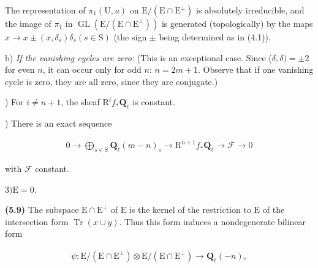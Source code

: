 \documentclass[10pt,leqno]{article}
\begin{document}
\noindent The representation of \(\pi _{1}(\mathrm{U},u)\) on \(\mathrm{E}/(\mathrm{E}\cap \mathrm{E}^{\perp })\) is absolutely irreducible, and the image of \(\pi _{1}\) in \(\operatorname{GL}(\mathrm{E}/(\mathrm{E}\cap \mathrm{E}^{\perp }))\) is generated (topologically) by the maps \(x\longrightarrow x\pm (x,\delta _{s})\delta _{s} (s\in \mathrm{S})\) (the sign \(\pm \) being determined as in (4.1)).\par

\clearpage

\label{physical-22}

\noindent b) \emph{If the vanishing cycles are zero:} (This is an exceptional case. Since (\(\delta ,\delta )=\pm 2\) for even \(n\), it can occur only for odd \(n\): \(n=2m+1\). Observe that if one vanishing cycle is zero, they are all zero, since they are conjugate.)\par

) For \(i\ne n+1\), the sheaf \(\mathrm{R}^{i} f_{*}\mathbf{Q}_{\ell }\) is constant.\par

) There is an exact sequence\par

\begin{equation*}\begin{gathered}0 \longrightarrow  \bigoplus\limits_{s\in \mathrm{S}} \mathbf{Q}_{\ell }(m- n)_{s} \longrightarrow  \mathrm{R}^{n+1}f_{*}\mathbf{Q}_{\ell } \longrightarrow  \mathcal{F}  \longrightarrow  0\end{gathered}\end{equation*}

\noindent with \(\mathcal{F} \) constant.\par

\noindent \(3) \mathrm{E}=0\).\par

\noindent \textbf{(5.9)} The subspace \(\mathrm{E}\cap \mathrm{E}^{\perp }\) of \(\mathrm{E}\) is the kernel of the restriction to \(\mathrm{E}\) of the intersection form \(\operatorname{Tr}(x\cup y)\). Thus this form induces a nondegenerate bilinear form\par

\begin{equation*}\begin{gathered}\psi  : \mathrm{E}/(\mathrm{E}\cap \mathrm{E}^{\perp })\otimes \mathrm{E}/(\mathrm{E}\cap \mathrm{E}^{\perp }) \longrightarrow  \mathbf{Q}_{\ell }(- n),\end{gathered}\end{equation*}
\end{document}
